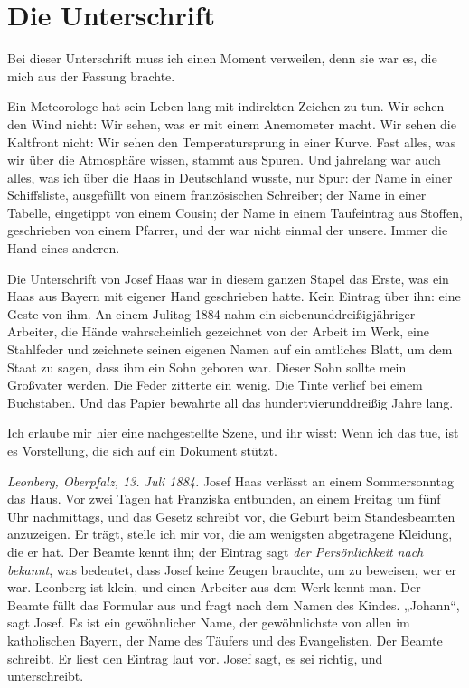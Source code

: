 \documentclass[
  ngerman,
  11pt,
  openany]{book}
\begin{document}
\section{Die Unterschrift}\label{die-unterschrift}

Bei dieser Unterschrift muss ich einen Moment verweilen, denn sie war
es, die mich aus der Fassung brachte.

Ein Meteorologe hat sein Leben lang mit indirekten Zeichen zu tun. Wir
sehen den Wind nicht: Wir sehen, was er mit einem Anemometer macht. Wir
sehen die Kaltfront nicht: Wir sehen den Temperatursprung in einer
Kurve. Fast alles, was wir über die Atmosphäre wissen, stammt aus
Spuren. Und jahrelang war auch alles, was ich über die Haas in
Deutschland wusste, nur Spur: der Name in einer Schiffsliste, ausgefüllt
von einem französischen Schreiber; der Name in einer Tabelle, eingetippt
von einem Cousin; der Name in einem Taufeintrag aus Stoffen, geschrieben
von einem Pfarrer, und der war nicht einmal der unsere. Immer die Hand
eines anderen.

Die Unterschrift von Josef Haas war in diesem ganzen Stapel das Erste,
was ein Haas aus Bayern mit eigener Hand geschrieben hatte. Kein Eintrag
über ihn: eine Geste von ihm. An einem Julitag 1884 nahm ein
siebenunddreißigjähriger Arbeiter, die Hände wahrscheinlich gezeichnet
von der Arbeit im Werk, eine Stahlfeder und zeichnete seinen eigenen
Namen auf ein amtliches Blatt, um dem Staat zu sagen, dass ihm ein Sohn
geboren war. Dieser Sohn sollte mein Großvater werden. Die Feder
zitterte ein wenig. Die Tinte verlief bei einem Buchstaben. Und das
Papier bewahrte all das hundertvierunddreißig Jahre lang.

Ich erlaube mir hier eine nachgestellte Szene, und ihr wisst: Wenn ich
das tue, ist es Vorstellung, die sich auf ein Dokument stützt.

\emph{Leonberg, Oberpfalz, 13. Juli 1884.} Josef Haas verlässt an einem
Sommersonntag das Haus. Vor zwei Tagen hat Franziska entbunden, an einem
Freitag um fünf Uhr nachmittags, und das Gesetz schreibt vor, die Geburt
beim Standesbeamten anzuzeigen. Er trägt, stelle ich mir vor, die am
wenigsten abgetragene Kleidung, die er hat. Der Beamte kennt ihn; der
Eintrag sagt \emph{der Persönlichkeit nach bekannt}, was bedeutet, dass
Josef keine Zeugen brauchte, um zu beweisen, wer er war. Leonberg ist
klein, und einen Arbeiter aus dem Werk kennt man. Der Beamte füllt das
Formular aus und fragt nach dem Namen des Kindes. „Johann``, sagt Josef.
Es ist ein gewöhnlicher Name, der gewöhnlichste von allen im
katholischen Bayern, der Name des Täufers und des Evangelisten. Der
Beamte schreibt. Er liest den Eintrag laut vor. Josef sagt, es sei
richtig, und unterschreibt.
\end{document}
